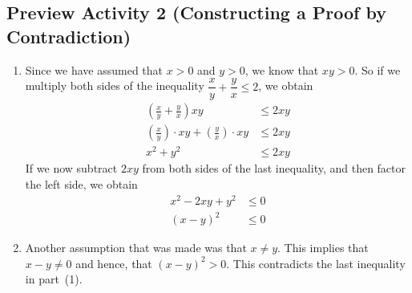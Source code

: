 \subsection*{Preview Activity 2 (Constructing a Proof by Contradiction)}
\begin{enumerate}
  \item Since we have assumed that $x > 0$ and $y > 0$, we know that $xy > 0$.  So if we multiply both sides of the inequality $\dfrac{x}{y} + \dfrac{y}{x} \leq 2$, we obtain
\begin{align*}
\left( \frac{x}{y} + \frac{y}{x} \right) xy &\leq 2xy \\
\left( \frac{x}{y} \right) \cdot xy + \left( \frac{y}{x} \right) \cdot xy &\leq 2xy \\
x^2 + y^2 &\leq 2xy
\end{align*}
If we now subtract $2xy$ from both sides of the last inequality, and then factor the left side, we obtain
\begin{align*}
x^2 - 2xy + y^2 &\leq 0 \\
\left( x - y \right)^2 &\leq 0
\end{align*}

\item Another assumption that was made was that $x \ne y$.  This implies that $x - y \ne 0$ and hence, that 
$(x - y)^2 > 0$.  This contradicts the last inequality in part~(1).
\end{enumerate}
\hbreak



\newpage

\endinput
